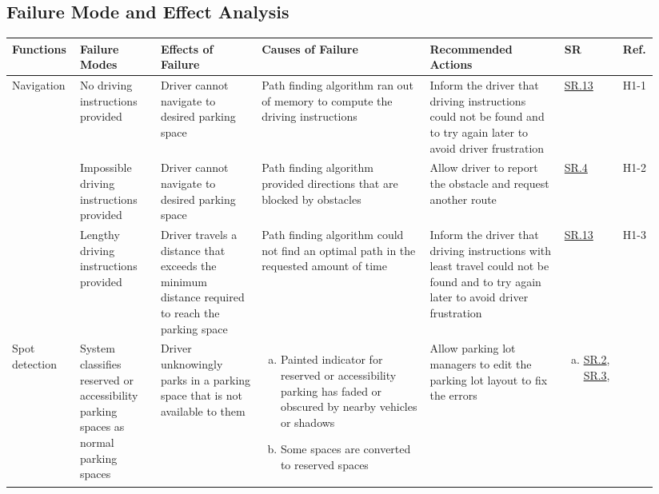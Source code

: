 \documentclass[12pt,letterpaper]{article}
\begin{document}
\begin{landscape}
\begin{table}[hp]
\section{Failure Mode and Effect Analysis}

\begin{tabular}{|p{0.09\linewidth}|p{0.12\linewidth}|p{0.15\linewidth}|p{0.25\linewidth}|p{0.2\linewidth}|p{0.075\linewidth}|p{0.05\linewidth}|}
\hline
Functions & Failure Modes & Effects of Failure & Causes of Failure & Recommended
Actions & SR & Ref.\\
\hline
Navigation & No driving instructions provided & Driver cannot navigate to
desired parking space & Path finding algorithm ran out of memory to compute the
driving instructions & Inform the driver that driving instructions could not be
found and to try again later to avoid driver frustration &
\hyperref[isr13]{SR.13} & H1-1\\\cline{2-7} & Impossible driving instructions
provided & Driver cannot navigate to desired parking space & Path finding
algorithm provided directions that are blocked by obstacles & Allow driver to
report the obstacle and request another route &  \hyperref[isr4]{SR.4} &
H1-2\\\cline{2-7} & Lengthy driving instructions provided & Driver travels a
distance that exceeds the minimum distance required to reach the parking space &
Path finding algorithm could not find an optimal path in the requested amount of
time & Inform the driver that driving instructions with least travel could not
be found and to try again later to avoid driver frustration &
\hyperref[isr13]{SR.13} & H1-3\\
\hline
Spot detection & System classifies reserved or accessibility parking spaces as
normal parking spaces & Driver unknowingly parks in a parking space that is not
available to them & \begin{enumerate}[a., leftmargin=0.5cm, noitemsep,
nolistsep]\item Painted indicator for reserved or accessibility parking has
faded or obscured by nearby vehicles or shadows \item Some spaces are converted
to reserved spaces \end{enumerate} & Allow parking lot managers to edit the
parking lot layout to fix the errors &  \begin{enumerate}[a., leftmargin=0.5cm,
noitemsep, nolistsep]\item \hyperref[asr2]{SR.2}, \hyperref[asr3]{SR.3},

\end{enumerate}
\end{tabular}
\end{table}
\end{landscape}
\end{document}
